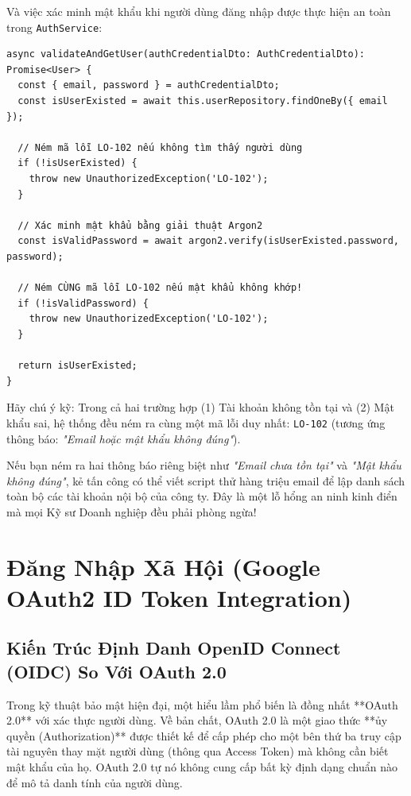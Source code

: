 \documentclass[12pt,a4paper,oneside]{book}
\begin{document}
Và việc xác minh mật khẩu khi người dùng đăng nhập được thực hiện an toàn trong \texttt{AuthService}:
\begin{codebox}
\begin{Verbatim}[fontsize=\small]
async validateAndGetUser(authCredentialDto: AuthCredentialDto): Promise<User> {
  const { email, password } = authCredentialDto;
  const isUserExisted = await this.userRepository.findOneBy({ email });
  
  // Ném mã lỗi LO-102 nếu không tìm thấy người dùng
  if (!isUserExisted) {
    throw new UnauthorizedException('LO-102');
  }

  // Xác minh mật khẩu bằng giải thuật Argon2
  const isValidPassword = await argon2.verify(isUserExisted.password, password);
  
  // Ném CÙNG mã lỗi LO-102 nếu mật khẩu không khớp!
  if (!isValidPassword) {
    throw new UnauthorizedException('LO-102');
  }

  return isUserExisted;
}
\end{Verbatim}
\end{codebox}

\begin{warningbox}
  Hãy chú ý kỹ: Trong cả hai trường hợp (1) Tài khoản không tồn tại và (2) Mật khẩu sai, hệ thống đều ném ra cùng một mã lỗi duy nhất: \texttt{LO-102} (tương ứng thông báo: \textit{"Email hoặc mật khẩu không đúng"}).
  
  Nếu bạn ném ra hai thông báo riêng biệt như \textit{"Email chưa tồn tại"} và \textit{"Mật khẩu không đúng"}, kẻ tấn công có thể viết script thử hàng triệu email để lập danh sách toàn bộ các tài khoản nội bộ của công ty. Đây là một lỗ hổng an ninh kinh điển mà mọi Kỹ sư Doanh nghiệp đều phải phòng ngừa!
\end{warningbox}

\chapter{Đăng Nhập Xã Hội (Google OAuth2 ID Token Integration)}

\section{Kiến Trúc Định Danh OpenID Connect (OIDC) So Với OAuth 2.0}
Trong kỹ thuật bảo mật hiện đại, một hiểu lầm phổ biến là đồng nhất **OAuth 2.0** với xác thực người dùng. Về bản chất, OAuth 2.0 là một giao thức **ủy quyền (Authorization)** được thiết kế để cấp phép cho một bên thứ ba truy cập tài nguyên thay mặt người dùng (thông qua Access Token) mà không cần biết mật khẩu của họ. OAuth 2.0 tự nó không cung cấp bất kỳ định dạng chuẩn nào để mô tả danh tính của người dùng.
\end{document}
